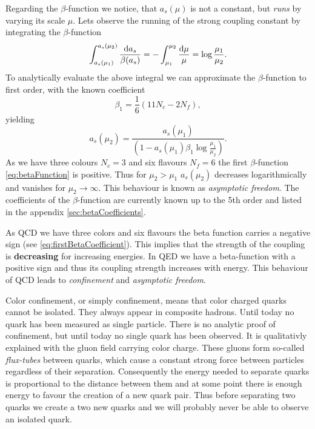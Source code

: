 \documentclass[../../index.tex]{subfiles}
\begin{document}
Regarding the $\beta$-function we notice, that $a_s(\mu)$ is not a constant, but
\textit{runs} by varying its scale $\mu$. Lets observe the running of the strong
coupling constant by integrating the $\beta$-function
\begin{equation}
  \int_{a_s(\mu_1)}^{a_s(\mu_2)}\frac{\dif a_s}{\beta(a_s)} = - \int_{\mu_1}^{\mu_2} \frac{\dif \mu}{\mu} = \log \frac{\mu_1}{\mu_2}.
\end{equation}
To analytically evaluate the above integral we can approximate the
$\beta$-function to first order, with the known coefficient
\begin{equation}
  \label{eq:firstBetaCoefficient}
  \beta_1 = \frac{1}{6}(11 N_c - 2 N_f),
\end{equation}
yielding
\begin{equation}
  a_s(\mu_2) = \frac{a_s(\mu_1)}{\left( 1 - a_s(\mu_1) \beta_1 \log\frac{\mu_1}{\mu_2} \right)}.
\end{equation}
As we have three colours $N_c=3$ and six flavours $N_f=6$ the first
$\beta$-function \ref{eq:betaFunction} is positive. Thus for $\mu_2>\mu_1$
$a_s(\mu_2)$ decreases logarithmically and vanishes for $\mu_2 \to \infty$. This
behaviour is known as \textit{asymptotic freedom}. The coefficients of the
$\beta$-function are currently known up to the 5th order and listed in the
appendix \ref{sec:betaCoefficients}.

As QCD we have three colors and six flavours the beta function carries a
negative sign (see \cref{eq:firstBetaCoefficient}). This implies that the
strength of the coupling is \textbf{decreasing} for increasing energies. In QED
we have a beta-function with a positive sign and thus its coupling strength
increases with energy. This behaviour of QCD leads to \textit{confinement} and
\textit{asymptotic freedom}.

Color confinement, or simply confinement, means that color charged quarks cannot
be isolated. They always appear in composite hadrons. Until today no quark has
been measured as single particle. There is no analytic proof of confinement, but
until today no single quark has been observed. It is qualitativly explained with
the gluon field carrying color charge. These gluons form so-called
\textit{flux-tubes} between quarks, which cause a constant strong force between
particles regardless of their separation. Consequently the energy needed to
separate quarks is proportional to the distance between them and at some point
there is enough energy to favour the creation of a new quark pair. Thus before
separating two quarks we create a two new quarks and we will probably never be
able to observe an isolated quark.
\end{document}
